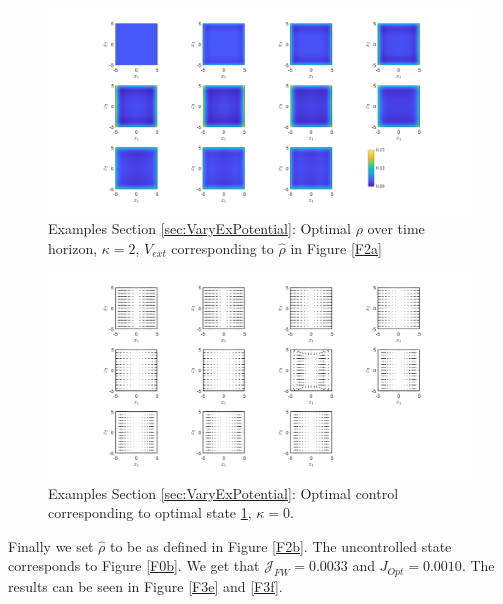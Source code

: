 \documentclass[11pt, a4paper]{article}
\theoremstyle{definition}
\newcommand{\hr}{\widehat \rho}
\begin{document}
\begin{figure}[h]
	\centering
	\includegraphics[scale=0.35]{rhoOptkV.png}
	\caption{Examples Section \ref{sec:VaryExPotential}: Optimal $\rho$ over time horizon, $\kappa = 2$, $V_{ext}$ corresponding to $\hr$ in Figure \ref{F2a}} 
	\label{F3c}
\end{figure}
\begin{figure}[h]
	\centering
	\includegraphics[scale=0.35]{ConOptkV.png}
	\caption{Examples Section \ref{sec:VaryExPotential}: Optimal control corresponding to optimal state \ref{F3c}, $\kappa = 0$.} 
	\label{F3d}
\end{figure}


Finally we set $\hr$ to be as defined in Figure \ref{F2b}. The uncontrolled state corresponds to Figure \ref{F0b}. We get that $\mathcal J_{FW} = 0.0033$ and $J_{Opt} = 0.0010$. The results can be seen in Figure \ref{F3e} and \ref{F3f}.
\end{document}
